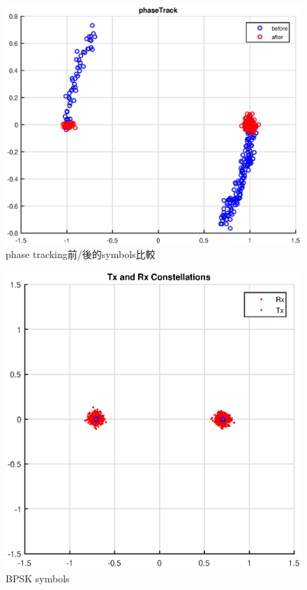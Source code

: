 \documentclass[10pt,a4paper]{article}
\begin{document}
\begin{minipage}{\linewidth}
    \centering
    \begin{minipage}{0.45\linewidth}
        \begin{figure}[H]
            \includegraphics[trim=30 10 30 10,clip,width=\linewidth]
            {figures/phase_track}
            \caption{phase tracking前/後的symbols比較}
        \end{figure}
    \end{minipage}
    \begin{minipage}{0.45\linewidth}
        \begin{figure}[H]
            \includegraphics[trim=30 10 30 10,clip,width=\linewidth]
            {figures/constellations}
            \caption{BPSK symbols}
        \end{figure}
    \end{minipage}
\end{minipage}
\end{document}
